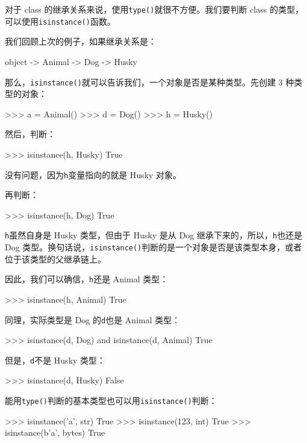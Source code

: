 对于 class 的继承关系来说，使用\texttt{type()}就很不方便。我们要判断
class 的类型，可以使用\texttt{isinstance()}函数。

我们回顾上次的例子，如果继承关系是：

\begin{pythoncode}
object -> Animal -> Dog -> Husky
\end{pythoncode}

那么，\texttt{isinstance()}就可以告诉我们，一个对象是否是某种类型。先创建
3 种类型的对象：

\begin{pythoncode}
>>> a = Animal()
>>> d = Dog()
>>> h = Husky()
\end{pythoncode}

然后，判断：

\begin{pythoncode}
>>> isinstance(h, Husky)
True
\end{pythoncode}

没有问题，因为\texttt{h}变量指向的就是 Husky 对象。

再判断：

\begin{pythoncode}
>>> isinstance(h, Dog)
True
\end{pythoncode}

\texttt{h}虽然自身是 Husky 类型，但由于 Husky 是从 Dog
继承下来的，所以，\texttt{h}也还是 Dog
类型。换句话说，\texttt{isinstance()}判断的是一个对象是否是该类型本身，或者位于该类型的父继承链上。

因此，我们可以确信，\texttt{h}还是 Animal 类型：

\begin{pythoncode}
>>> isinstance(h, Animal)
True
\end{pythoncode}

同理，实际类型是 Dog 的\texttt{d}也是 Animal 类型：

\begin{pythoncode}
>>> isinstance(d, Dog) and isinstance(d, Animal)
True
\end{pythoncode}

但是，\texttt{d}不是 Husky 类型：

\begin{pythoncode}
>>> isinstance(d, Husky)
False
\end{pythoncode}

能用\texttt{type()}判断的基本类型也可以用\texttt{isinstance()}判断：

\begin{pythoncode}
>>> isinstance('a', str)
True
>>> isinstance(123, int)
True
>>> isinstance(b'a', bytes)
True
\end{pythoncode}

